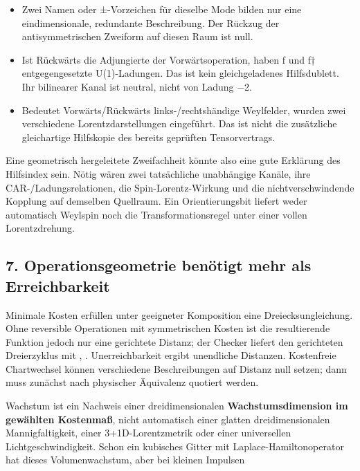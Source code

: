 \begin{itemize}
\tightlist
\item
  Zwei Namen oder ±-Vorzeichen für dieselbe Mode bilden nur eine
  eindimensionale, redundante Beschreibung. Der Rückzug der
  antisymmetrischen Zweiform auf diesen Raum ist null.
\item
  Ist Rückwärts die Adjungierte der Vorwärtsoperation, haben f und f†
  entgegengesetzte U(1)-Ladungen. Das ist kein gleichgeladenes
  Hilfsdublett. Ihr bilinearer Kanal ist neutral, nicht von Ladung −2.
\item
  Bedeutet Vorwärts/Rückwärts links-/rechtshändige Weylfelder, wurden
  zwei verschiedene Lorentzdarstellungen eingeführt. Das ist nicht die
  zusätzliche gleichartige Hilfskopie des bereits geprüften
  Tensorvertrags.
\end{itemize}

Eine geometrisch hergeleitete Zweifachheit könnte also eine gute
Erklärung des Hilfsindex sein. Nötig wären zwei tatsächliche unabhängige
Kanäle, ihre CAR-/Ladungsrelationen, die Spin-Lorentz-Wirkung und die
nichtverschwindende Kopplung auf demselben Quellraum. Ein
Orientierungsbit liefert weder automatisch Weylspin noch die
Transformationsregel unter einer vollen Lorentzdrehung.

\subsection{7. Operationsgeometrie benötigt mehr als
Erreichbarkeit}\label{operationsgeometrie-benuxf6tigt-mehr-als-erreichbarkeit}

Minimale Kosten erfüllen unter geeigneter Komposition eine
Dreiecksungleichung. Ohne reversible Operationen mit symmetrischen
Kosten ist die resultierende Funktion jedoch nur eine gerichtete
Distanz; der Checker liefert den gerichteten Dreierzyklus mit
, . Unerreichbarkeit ergibt
unendliche Distanzen. Kostenfreie Chartwechsel können verschiedene
Beschreibungen auf Distanz null setzen; dann muss zunächst nach
physischer Äquivalenz quotiert werden.

Wachstum  ist ein Nachweis einer
dreidimensionalen \textbf{Wachstumsdimension im gewählten Kostenmaß},
nicht automatisch einer glatten dreidimensionalen Mannigfaltigkeit,
einer 3+1D-Lorentzmetrik oder einer universellen Lichtgeschwindigkeit.
Schon ein kubisches Gitter mit Laplace-Hamiltonoperator hat dieses
Volumenwachstum, aber bei kleinen Impulsen

